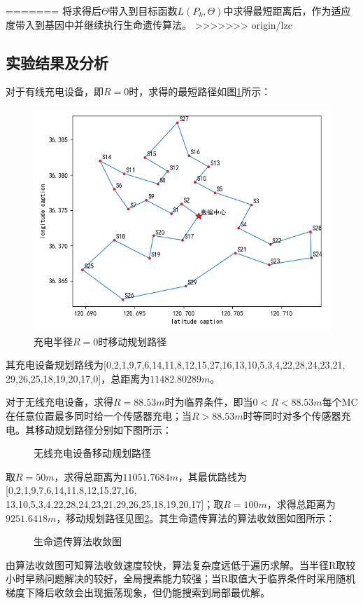 \documentclass{whutmod}
\begin{document}
\begin{table}[H]
\begin{tablenotes}
=======
		将求得后$\Theta$带入到目标函数$L(P_k, \Theta)$中求得最短距离后，作为适应度带入到基因中并继续执行生命遗传算法。	
>>>>>>> origin/lzc
    \subsection{实验结果及分析}
        对于有线充电设备，即$R=0$时，求得的最短路径如图\ref{sssssssssss}所示：
        \begin{figure}[H]
        	\centering
        	\includegraphics[width=.6\textwidth]{figures/w1.png}
        	\caption{充电半径$R=0$时移动规划路径}\label{sssssssssss}
        \end{figure}
       其充电设备规划路线为[0,2,1,9,7,6,14,11,8,12,15,27,16,13,10,5,3,4,22,28,24,23,21,\\29,26,25,18,19,20,17,0]，总距离为$11482.80289m$。
        
        对于无线充电设备，求得$R=88.53m$时为临界条件，即当$0<R<88.53m$每个MC在任意位置最多同时给一个传感器充电；当$R>88.53m$时等同时对多个传感器充电。其移动规划路径分别如下图所示：
        \begin{figure}[H]
        	\centering
        	\caption{无线充电设备移动规划路径}
        	\label{ssw}
        \end{figure}
    
    取$R=50m$，求得总距离为$11051.7684m$，其最优路线为 [0,2,1,9,7,6,14,11,8,12,15,27,16,\\13,10,5,3,4,22,28,24,23,21,29,26,25,18,19,20,17]；取$R=100m$，求得总距离为$9251.6418m$，移动规划路径见图\ref{ssw}。其生命遗传算法的算法收敛图如图所示：
        \begin{figure}[H]
	\centering
	\caption{生命遗传算法收敛图}
		\end{figure}
	    由算法收敛图可知算法收敛速度较快，算法复杂度远低于遍历求解。当半径R取较小时早熟问题解决的较好，全局搜素能力较强；当R取值大于临界条件时采用随机梯度下降后收敛会出现振荡现象，但仍能搜索到局部最优解。
	

\end{tablenotes}
\end{table}
\end{document}
